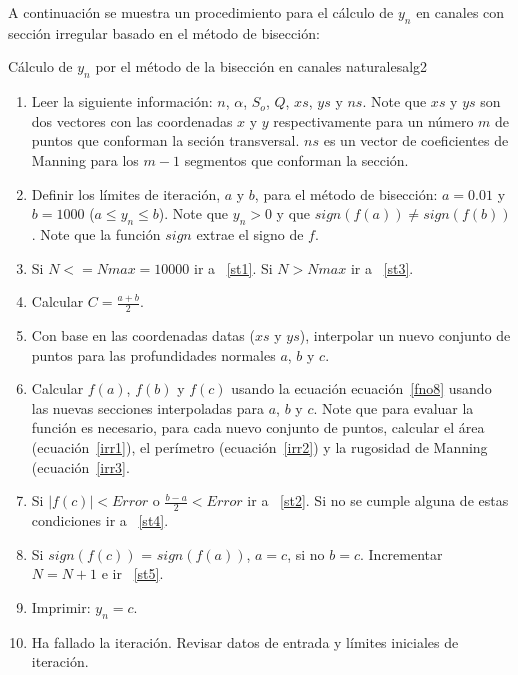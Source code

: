 \documentclass[11pt, oneside]{article}
\begin{document}
A continuaci\'on se muestra un procedimiento para el c\'alculo de $y_n$ en canales con secci\'on irregular basado en el m\'etodo de bisecci\'on:
\begin{alg}{C\'alculo de $y_n$ por el m\'etodo de la bisecci\'on en canales naturales}{alg2}
\begin{enumerate}
\item Leer la siguiente informaci\'on: $n$, $\alpha$, $S_o$, $Q$, $xs$, $ys$ y $ns$. Note que $xs$ y $ys$ son dos vectores con las coordenadas $x$ y $y$ respectivamente para un n\'umero $m$ de puntos que conforman la seci\'on transversal. $ns$ es un vector de coeficientes de Manning para los $m-1$ segmentos que conforman la sección.

\item Definir los l\'imites de iteraci\'on, $a$ y $b$, para el m\'etodo de bisecci\'on: $a = 0.01$ y $b=1000$ ($a \le y_n \le b$). Note que $y_n > 0$ y que $sign(f(a)) \neq sign(f(b)) $. Note que la funci\'on $sign$ extrae el signo de $f$.

\item \label{st5} Si $N <= Nmax=10000$ ir a ~\ref{st1}. Si $N > Nmax$ ir a ~\ref{st3}.  
\item \label{st1} Calcular $C = \frac{a+b}{2}$.
\item Con base en las coordenadas datas ($xs$ y $ys$), interpolar un nuevo conjunto de puntos para las profundidades normales $a$, $b$ y $c$.   
\item Calcular $f(a)$, $f(b)$ y $f(c)$ usando la ecuaci\'on ecuaci\'on~\ref{fno8} usando las nuevas secciones interpoladas para $a$, $b$ y $c$. Note que para evaluar la funci\'on es necesario, para cada nuevo conjunto de puntos, calcular el \'area (ecuaci\'on~\ref{irr1}), el perímetro (ecuaci\'on~\ref{irr2}) y la rugosidad de Manning (ecuaci\'on~\ref{irr3}.
\item Si $|f(c)|< Error$ o $\frac{b-a}{2} < Error$ ir a ~\ref{st2}. Si no se cumple alguna de estas  condiciones ir a ~\ref{st4}.
\item \label{st4} Si $sign(f(c))$ = $sign(f(a))$, $a=c$, si no $b=c$. Incrementar $N=N+1$ e ir ~\ref{st5}. 
\item \label{st2} Imprimir: $y_n = c$.
\item \label{st3} Ha fallado la iteraci\'on. Revisar datos de entrada y l\'imites iniciales de iteraci\'on.
\end{enumerate}
\end{alg}

\end{document}
